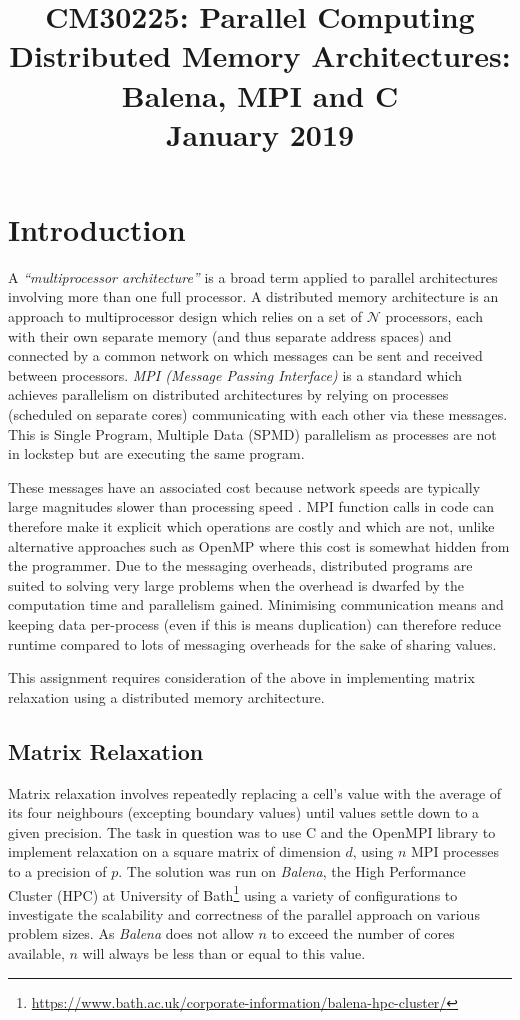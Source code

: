 \documentclass[11pt]{article}
\date{}
\author{}
\title{{\color{indigo}\textbf{CM30225: Parallel Computing}}\\\small \textbf{Distributed Memory Architectures: Balena, MPI and C\\January 2019}\vspace{-15ex}}
\begin{document}
\maketitle
\footnotesize\tableofcontents
\clearpage
\normalsize
\pgfplotsset{compat=1.16}

{\color{indigo}
\section{Introduction}}
A \textit{``multiprocessor architecture''} is a broad term applied to parallel architectures involving more than one full processor. A distributed memory architecture is an approach to multiprocessor design which relies on a set of $\mathcal{N}$ processors, each with their own separate memory (and thus separate address spaces) and connected by a common network on which messages can be sent and received between processors.  \textsl{MPI (Message Passing Interface)} is a standard which achieves parallelism on distributed architectures by relying on processes (scheduled on separate cores) communicating with each other via these messages. This is Single Program, Multiple Data (SPMD) parallelism as processes are not in lockstep but are executing the same program.

These messages have an associated cost because network speeds are typically large magnitudes slower than processing speed \citep{nielsen2016}. MPI function calls in code can therefore make it explicit which operations are costly and which are not, unlike alternative approaches such as OpenMP where this cost is somewhat hidden from the programmer.  Due to the messaging overheads, distributed programs are suited to solving very large problems when the overhead is dwarfed by the computation time and parallelism gained. Minimising communication means and keeping data per-process (even if this is means duplication) can therefore reduce runtime compared to lots of messaging overheads for the sake of sharing values.

This assignment requires consideration of the above in implementing matrix relaxation using a distributed memory architecture.

{\color{darkindigo}
\subsection*{Matrix Relaxation}}
Matrix relaxation involves repeatedly replacing a cell's value with the average of its four neighbours (excepting boundary values) until values settle down to a given precision. The task in question was to use C and the OpenMPI library to implement relaxation on a square matrix of dimension $d$, using $n$ MPI processes to a precision of $p$.  The solution was run on \textsl{Balena}, the High Performance Cluster (HPC) at University of Bath\footnote{\url{https://www.bath.ac.uk/corporate-information/balena-hpc-cluster/}} using a variety of configurations to investigate the scalability and correctness of the parallel approach on various problem sizes. As \textsl{Balena} does not allow $n$ to exceed the number of cores available, $n$ will always be less than or equal to this value.
\end{document}
